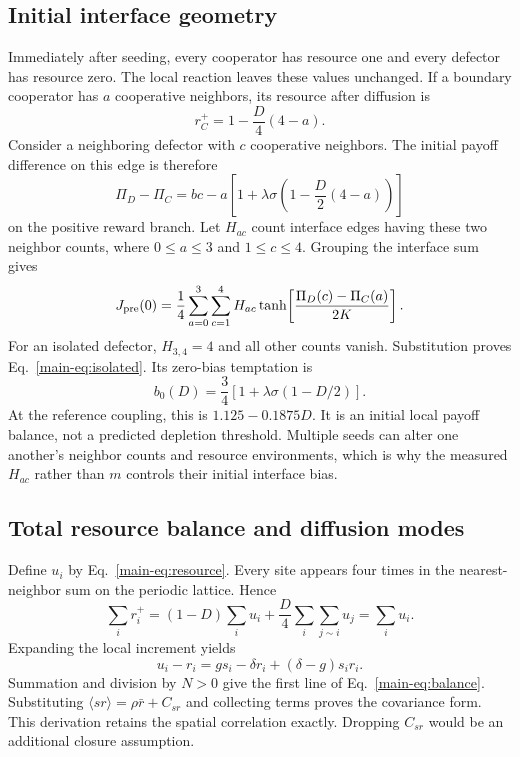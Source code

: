 \subsection{Initial interface geometry}

Immediately after seeding, every cooperator has resource one and every defector has resource zero. The local reaction leaves these values unchanged. If a boundary cooperator has $a$ cooperative neighbors, its resource after diffusion is
\begin{equation}
\label{eq:initial_resource}
r_C^+=1-\frac D4(4-a).
\end{equation}
Consider a neighboring defector with $c$ cooperative neighbors. The initial payoff difference on this edge is therefore
\begin{equation}
\label{eq:initial_gap}
\Pi_D-\Pi_C
=bc-a\!\left[1+\lambda\sigma
 \left(1-\frac D2(4-a)\right)\right]
\end{equation}
on the positive reward branch. Let $H_{ac}$ count interface edges having these two neighbor counts, where $0\le a\le3$ and $1\le c\le4$. Grouping the interface sum gives
\begin{equation}
\label{eq:motifs}
J_{\rm pre}(0)=\frac14
\sum_{a=0}^{3}\sum_{c=1}^{4}
H_{ac}\tanh\!\left[\frac{\Pi_D(c)-\Pi_C(a)}{2K}\right].
\end{equation}
For an isolated defector, $H_{3,4}=4$ and all other counts vanish. Substitution proves Eq.~\eqref{main-eq:isolated}. Its zero-bias temptation is
\begin{equation}
\label{eq:isolated_zero}
b_0(D)=\frac34[1+\lambda\sigma(1-D/2)].
\end{equation}
At the reference coupling, this is $1.125-0.1875D$. It is an initial local payoff balance, not a predicted depletion threshold. Multiple seeds can alter one another's neighbor counts and resource environments, which is why the measured $H_{ac}$ rather than $m$ controls their initial interface bias.

\subsection{Total resource balance and diffusion modes}

Define $u_i$ by Eq.~\eqref{main-eq:resource}. Every site appears four times in the nearest-neighbor sum on the periodic lattice. Hence
\begin{equation}
\label{eq:resource_total}
\sum_i r_i^+
=(1-D)\sum_i u_i+\frac D4\sum_i\sum_{j\sim i}u_j
=\sum_i u_i.
\end{equation}
Expanding the local increment yields
\begin{equation}
\label{eq:local_balance}
u_i-r_i=g s_i-\delta r_i+(\delta-g)s_i r_i.
\end{equation}
Summation and division by $N>0$ give the first line of Eq.~\eqref{main-eq:balance}. Substituting $\langle sr\rangle=\rho\bar r+C_{sr}$ and collecting terms proves the covariance form. This derivation retains the spatial correlation exactly. Dropping $C_{sr}$ would be an additional closure assumption.


